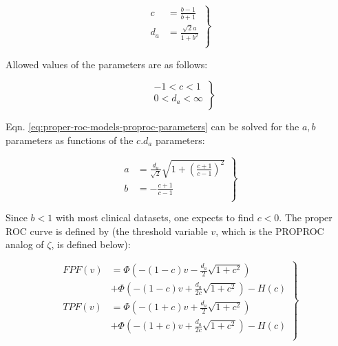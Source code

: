\documentclass[
]{book}
\begin{document}
\begin{equation} 
\left.\begin{aligned}
c &= \frac{b-1}{b+1} \\
d_a &= \frac{\sqrt{2}a}{1+b^2} \\
\end{aligned}\right\}
\label{eq:proper-roc-models-proproc-parameters}
\end{equation}

Allowed values of the parameters are as follows:

\begin{equation} 
\left.\begin{aligned}
& -1 < c < 1 \\
& 0 < d_a < \infty \\
\end{aligned}\right\}
\label{eq:proper-roc-models-proproc-parameter-ranges}
\end{equation}

Eqn. \eqref{eq:proper-roc-models-proproc-parameters} can be solved for the \(a,b\) parameters as functions of the \(c.d_a\) parameters:

\begin{equation} 
\left.\begin{aligned}
a &= \frac{d_a}{\sqrt{2}}\sqrt{1+{{\left( \frac{c+1}{c-1} \right)^2}}} \\
b &= -\frac{c+1}{c-1} \\
\end{aligned}\right\}
\label{eq:proper-roc-models-proproc-parameters-transform}
\end{equation}

Since \(b < 1\) with most clinical datasets, one expects to find \(c < 0\). The proper ROC curve is defined by \citep{metz1999proper} (the threshold variable \(v\), which is the PROPROC analog of \(\zeta\), is defined below):

\begin{equation} 
\left.\begin{aligned}
FPF\left( v \right) &= \Phi\left( -\left( 1-c \right)v -\frac{d_a}{2}\sqrt{1+c^2}  \right) \\ 
&+\Phi\left( -\left( 1-c \right)v +\frac{d_a}{2c}\sqrt{1+c^2} \right)  -H(c) \\
TPF\left( v \right) &= \Phi\left( -\left( 1+c \right)v +\frac{d_a}{2}\sqrt{1+c^2}  \right)  \\ &+\Phi\left( -\left( 1+c \right)v +\frac{d_a}{2c}\sqrt{1+c^2} \right)  -H(c) \\
\end{aligned}\right\}
\label{eq:proper-roc-models-v-range}
\end{equation}
\end{document}
